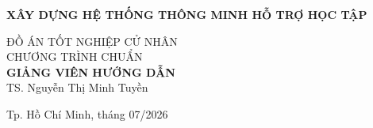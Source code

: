 \begin{titlepage}
\begin{center}

{ \Large \bfseries XÂY DỰNG HỆ THỐNG THÔNG MINH HỖ TRỢ HỌC TẬP\\[2cm] } 


\large ĐỒ ÁN TỐT NGHIỆP CỬ NHÂN\\
\large CHƯƠNG TRÌNH CHUẨN\\[2cm]

\textbf{GIẢNG VIÊN HƯỚNG DẪN}\\
TS. Nguyễn Thị Minh Tuyền\\


\vfill
Tp. Hồ Chí Minh, tháng 07/2026

\end{center}
\end{titlepage}

